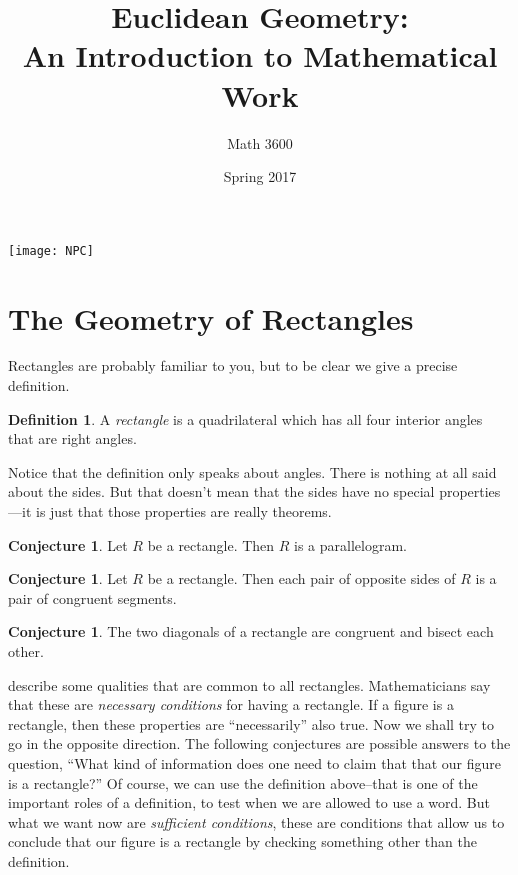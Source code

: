\documentclass{tufte-handout}
\title{Euclidean Geometry:\\An Introduction to Mathematical Work}
\author[]{Math 3600}
\date{Spring 2017}
\theoremstyle{definition}
\newtheorem{conjecture}[problem]{Conjecture}
\newtheorem*{definition}{Definition}
\begin{document}
\maketitle
\begin{marginfigure}
    \texttt{[image: NPC]}
\end{marginfigure}

\setcounter{section}{3}
\section{The Geometry of Rectangles}\label{section:rectangles}

Rectangles are probably familiar to you, but to be clear we give a precise definition.
\begin{definition}\label{defn:rectangle}
A \emph{rectangle} is a quadrilateral which has all four interior angles that are right angles.
\end{definition}

Notice that the definition only speaks about angles. There is nothing at all said about the sides.
But that doesn't mean that the sides have no special properties---it is just that those properties are really theorems.

\begin{conjecture}\label{conj:rectangle-parallelogram}
Let $R$ be a rectangle. Then $R$ is a parallelogram.
\end{conjecture}

\begin{conjecture}\label{conj:rectangle-opp-sides}
Let $R$ be a rectangle. Then each pair of opposite sides of $R$ is a pair of congruent segments.
\end{conjecture}

\begin{conjecture}\label{conj:rectangle-diagonals}
The two diagonals of a rectangle are congruent and bisect each other.
\end{conjecture}

 describe some qualities that are common to all rectangles. Mathematicians say that these are \emph{necessary conditions} for having a rectangle.
If a figure is a rectangle, then these properties are ``necessarily'' also true. Now we shall try to go in the opposite direction.
The following conjectures are possible answers to the question, ``What kind of information does one need to claim that that our figure is a rectangle?''
Of course, we can use the definition above--that is one of the important roles of a definition, to test when we are allowed to use a word.
But what we want now are \emph{sufficient conditions}, these are conditions that allow us to conclude that our figure is a rectangle by checking something other than the definition.
\end{document}
